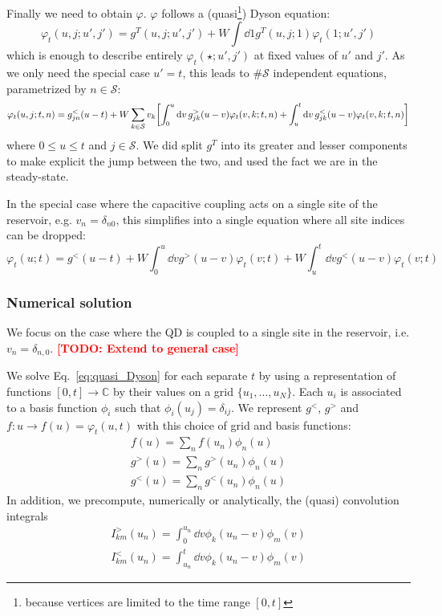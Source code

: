 \documentclass[12pt]{article}
\newcommand\TODO[1]{\textcolor{red}{\textbf{[TODO: #1]}}}
\begin{document}
Finally we need to obtain $\varphi$. 
$\varphi$ follows a (quasi\footnote{because vertices are limited to the time range $[0, t]$}) Dyson equation:
\begin{equation}
	\varphi_t(u, j; u', j') = g^T(u, j; u', j') + W \int \dd{1} g^T(u, j; 1) \varphi_t(1; u', j')
\end{equation}
which is enough to describe entirely $\varphi_t(\star; u', j')$ at fixed values of $u'$ and $j'$. As we only need the special case $u' = t$, this leads to $\# \mathcal{S}$ independent equations, parametrized by $n \in \mathcal{S}$:
\begin{equation}
	\label{eq:quasi_Dyson}
	\varphi_t(u, j; t, n) = g_{jn}^<(u - t) + W \sum_{k \in \mathcal{S}} v_k \qty[ \int_0^u \dd{v} g_{jk}^>(u - v) \varphi_t(v, k; t, n) + \int_u^t \dd{v} g_{jk}^<(u - v) \varphi_t(v, k; t, n) ]
\end{equation}
where $0 \le u \le t$ and $j \in \mathcal{S}$.
We did split $g^T$ into its greater and lesser components to make explicit the jump between the two, and used the fact we are in the steady-state.

In the special case where the capacitive coupling acts on a single site of the reservoir, e.g. $v_n = \delta_{n0}$, this simplifies into a single equation where all site indices can be dropped:
\begin{equation}
	\label{eq:quasi_Dyson_single_site}
	\varphi_t(u; t) = g^<(u - t) + W \int_0^u \dd{v} g^>(u - v) \varphi_t(v; t) + W \int_u^t \dd{v} g^<(u - v) \varphi_t(v; t)
\end{equation}


\subsubsection{Numerical solution}

We focus on the case where the \ac{QD} is coupled to a single site in the reservoir, i.e. $v_n = \delta_{n,0}$.
\TODO{Extend to general case}

We solve Eq.~\eqref{eq:quasi_Dyson} for each separate $t$ by using a representation of functions $[0, t] \rightarrow \mathbb{C}$ by their values on a grid $\{u_1, \ldots, u_N\}$. Each $u_i$ is associated to a basis function $\phi_i$ such that $\phi_i(u_j) = \delta_{ij}$. We represent $g^<$, $g^>$ and $f:u \rightarrow f(u) = \varphi_t(u, t)$ with this choice of grid and basis functions:
\begin{gather}
	f(u) = \sum_n f(u_n) \phi_n(u)
	\\
	g^>(u) = \sum_n g^>(u_n) \phi_n(u)
	\\
	g^<(u) = \sum_n g^<(u_n) \phi_n(u)
\end{gather}
In addition, we precompute, numerically or analytically, the (quasi) convolution integrals
\begin{gather}
	I^>_{km}(u_n) = \int_0^{u_n} \dd{v} \phi_k(u_n - v) \phi_m(v)
	\\
	I^<_{km}(u_n) = \int_{u_n}^t \dd{v} \phi_k(u_n - v) \phi_m(v)
\end{gather}
\end{document}
